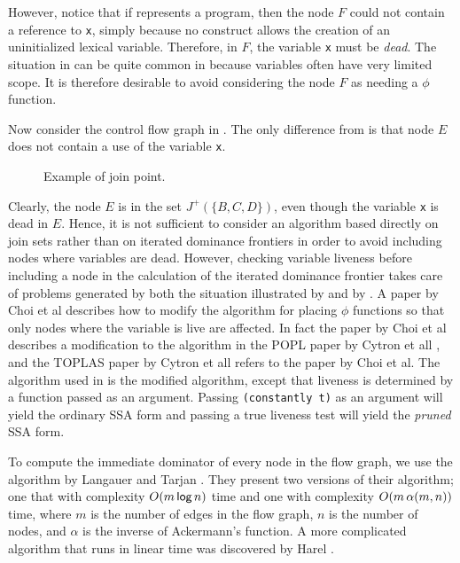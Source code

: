 However, notice that if  represents a
\commonlisp{} program, then the node $F$ could not contain a reference
to \texttt{x}, simply because no \commonlisp{} construct allows the
creation of an uninitialized lexical variable.  Therefore, in $F$, the
variable \texttt{x} must be \emph{dead}.  The situation in
 can be quite common in \commonlisp{} because
variables often have very limited scope.  It is therefore desirable to
avoid considering the node $F$ as needing a $\phi$ function.

Now consider the control flow graph in .  The
only difference from  is that node $E$ does not
contain a use of the variable \texttt{x}.

\begin{figure}
\begin{center}
\end{center}
\caption{\label{fig-ssa-join-2}
Example of join point.}
\end{figure}

Clearly, the node $E$ is in the set $J^+(\{B, C, D\})$, even though
the variable \texttt{x} is dead in $E$.  Hence, it is not sufficient
to consider an algorithm based directly on join sets rather than on
iterated dominance frontiers in order to avoid including nodes where
variables are dead.  However, checking variable liveness before
including a node in the calculation of the iterated dominance frontier
takes care of problems generated by both the situation illustrated by
 and by .  A paper by
Choi et al \cite{Choi:1991:ACS:99583.99594} describes how to modify
the algorithm for placing $\phi$ functions so that only nodes where
the variable is live are affected.  In fact the paper by Choi et al
describes a modification to the algorithm in the POPL paper by Cytron
et all \cite{Cytron:1989:EMC:75277.75280}, and the TOPLAS paper by
Cytron et all \cite{Cytron:1991:ECS:115372.115320} refers to the paper
by Choi et al.  The algorithm used in \sysname{} is the modified
algorithm, except that liveness is determined by a function passed as
an argument.  Passing \texttt{(constantly t)} as an argument will
yield the ordinary SSA form and passing a true liveness test will
yield the \emph{pruned} SSA form.

To compute the immediate dominator of every node in the flow graph, we
use the algorithm by Langauer and Tarjan
\cite{Lengauer:1979:FAF:357062.357071}.  They present two versions of
their algorithm; one that with complexity
$O(m \thinspace\textsf{log}\thinspace n)$ time and one with complexity
$O(m \thinspace\alpha (m, n))$ time, where $m$ is the number of edges
in the flow graph, $n$ is the number of nodes, and $\alpha$ is the
inverse of Ackermann's function.  A more complicated algorithm that
runs in linear time was discovered by Harel
\cite{Harel:1985:LAF:22145.22166}.

